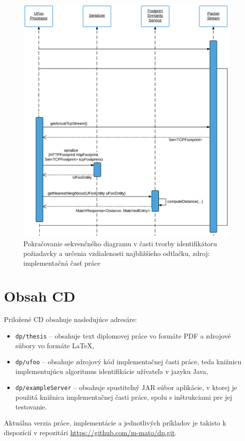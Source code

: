 \documentclass[
  printed, %
  table,   %
  lof,     %
  nolot,   %
  nocover
]{fithesis3}
\begin{document}
\begin{figure}[H]
  \centering
    \includegraphics[width=1.1\textwidth]{images/footprint-impl-flow-2.png}
  \caption{Pokračovanie sekvenčného diagramu v časti tvorby identifikátoru požiadavky a
  určenia vzdialenosti najbližšieho odtlačku, zdroj: implementačná časť práce}
\end{figure}

\newpage
\thispagestyle{empty}
\mbox{}
\chapter{Obsah CD}
Priložené CD obsahuje nasledujúce adresáre:
\begin{itemize}
\item \texttt{dp/thesis} -- obsahuje text diplomovej práce vo formáte PDF a
zdrojové súbory vo formáte \LaTeX,
\item \texttt{dp/ufoo} -- obsahuje zdrojový kód implementačnej časti práce,
teda knižnicu implementujúcu algoritmus identifikácie užívateľa v jazyku Java,
\item \texttt{dp/exampleServer} -- obsahuje spustiteľný JAR súbor aplikácie, v
ktorej je použitá knižnica implementačnej časti práce, spolu s inštrukciami pre
jej testovanie.
\end{itemize}
Aktuálna verzia práce, implementácie a jednotlivých príkladov je
takisto k dispozícií v repozitári \url{https://github.com/m-mato/dp.git}.
\end{document}
